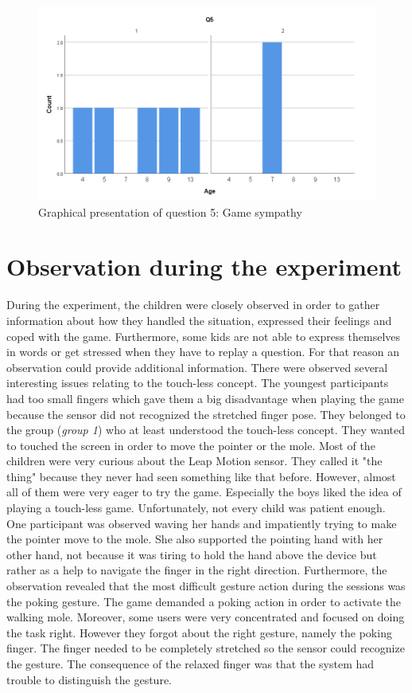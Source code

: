 \begin{figure}[!ht]
    \centering
    \includegraphics[width=.6\textwidth]{figures/Q5.png}
    \caption{Graphical presentation of question 5: Game sympathy }
    \label{fig:Q5}
\end{figure}



\section{Observation during the experiment}
During the experiment, the children were closely observed in order to gather information about how they handled the situation, expressed their feelings and coped with the game. Furthermore, some kids are not able to express themselves in words or get stressed when they have to replay a question. For that reason an observation could provide additional information.
There were observed several interesting issues relating to the touch-less concept. The youngest participants had too small fingers which gave them a big disadvantage when playing the game because the sensor did not recognized the stretched finger pose. They belonged to the group (\textit{group 1}) who at least understood the touch-less concept. They wanted to touched the screen in order to move the pointer or the mole. 
Most of the children were very curious about the Leap Motion sensor. They called it "the thing" because they never had seen something like that before. However, almost all of them were very eager to try the game. Especially the boys liked the idea of playing a touch-less game.
Unfortunately, not every child was patient enough. One participant was observed waving her hands and impatiently trying to make the pointer move to the mole. She also supported the pointing hand with her other hand, not because it was tiring to hold the hand above the device but rather as a help to navigate the finger in the right direction.  
Furthermore, the observation revealed that the most difficult gesture action during the sessions was the poking gesture. The game demanded a poking action in order to activate the walking mole.
Moreover, some users were very concentrated and focused on doing the task right. However they forgot about the right gesture, namely the poking finger. The finger needed to be completely stretched so the sensor could recognize the gesture. The consequence of the relaxed finger was that the system had trouble to distinguish the gesture.

